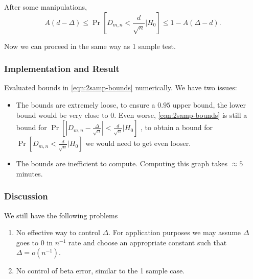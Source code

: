 After some manipulations,
\begin{equation}
	 A(d - \Delta) \le 
\operatorname{Pr} \left[ D_{m, n}  < \frac{d}{\sqrt{n} }| H_0 \right] \le 
1 - A(\Delta - d)
.\end{equation} 

Now we can proceed in the same way as 1 sample test.

\subsubsection*{Implementation and Result}
Evaluated bounds in \eqref{eqn:2samp-bounds} numerically. We have two issues:
\begin{itemize}
	\item The bounds are extremely loose, to ensure a $0.95$ upper bound, the lower bound would be very close to $0$. Even worse, \eqref{eqn:2samp-bounds} is still a bound for 
		$ \operatorname{Pr} \left[ |D_{m, n} - \frac{\Delta}{\sqrt{n} }| < \frac{d}{\sqrt{n} }| H_0 \right] $
	, to obtain a bound for 
$\operatorname{Pr} \left[ D_{m, n}  < \frac{d}{\sqrt{n} }| H_0 \right] $
we would need to get even looser.
	\item The bounds are inefficient to compute. Computing this graph takes $\approx 5$ minutes.
\end{itemize}

\subsubsection*{Discussion}
We still have the following problems
\begin{enumerate}
	\item No effective way to control $\Delta$. For application purposes we may assume $\Delta$ goes to $0$ in $n^{-1} $ rate and choose an appropriate constant such that $\Delta = o(n^{-1} )$.
	\item No control of beta error, similar to the 1 sample case.
\end{enumerate}
